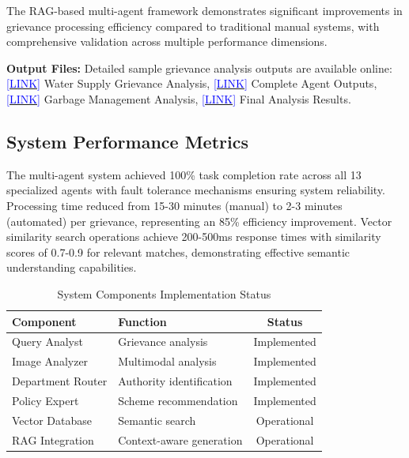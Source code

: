 \documentclass[conference]{IEEEtran}
\begin{document}
The RAG-based multi-agent framework demonstrates significant improvements in grievance processing efficiency compared to traditional manual systems, with comprehensive validation across multiple performance dimensions.

\textbf{Output Files:} Detailed sample grievance analysis outputs are available online:
\href{https://raw.githubusercontent.com/kunalpro379/BEProject_Grivance_Redressal_Agent/refs/heads/master/outputs/NoWaterGrivanceOutput.md}{\textcolor{blue}{[LINK]}} Water Supply Grievance Analysis,
\href{https://raw.githubusercontent.com/kunalpro379/BEProject_Grivance_Redressal_Agent/refs/heads/master/outputs/all_agent_outputs.json}{\textcolor{blue}{[LINK]}} Complete Agent Outputs,
\href{https://raw.githubusercontent.com/kunalpro379/BEProject_Grivance_Redressal_Agent/refs/heads/master/outputs/garbage_analysis_results.json}{\textcolor{blue}{[LINK]}} Garbage Management Analysis,
\href{https://raw.githubusercontent.com/kunalpro379/BEProject_Grivance_Redressal_Agent/refs/heads/master/outputs/grievance_analysis_final.json}{\textcolor{blue}{[LINK]}} Final Analysis Results.

\subsection{System Performance Metrics}

The multi-agent system achieved 100\% task completion rate across all 13 specialized agents with fault tolerance mechanisms ensuring system reliability. Processing time reduced from 15-30 minutes (manual) to 2-3 minutes (automated) per grievance, representing an 85\% efficiency improvement. Vector similarity search operations achieve 200-500ms response times with similarity scores of 0.7-0.9 for relevant matches, demonstrating effective semantic understanding capabilities.

\begin{table}[htbp]
\caption{System Components Implementation Status}
\begin{center}
\begin{tabular}{|p{3cm}|p{2.5cm}|c|}
\hline
\textbf{Component} & \textbf{Function} & \textbf{Status} \\
\hline
Query Analyst & Grievance analysis & Implemented \\
\hline
Image Analyzer & Multimodal analysis & Implemented \\
\hline
Department Router & Authority identification & Implemented \\
\hline
Policy Expert & Scheme recommendation & Implemented \\
\hline
Vector Database & Semantic search & Operational \\
\hline
RAG Integration & Context-aware generation & Operational \\
\hline
\end{tabular}
\label{tab:implementation_status}
\end{center}
\end{table}
\end{document}

